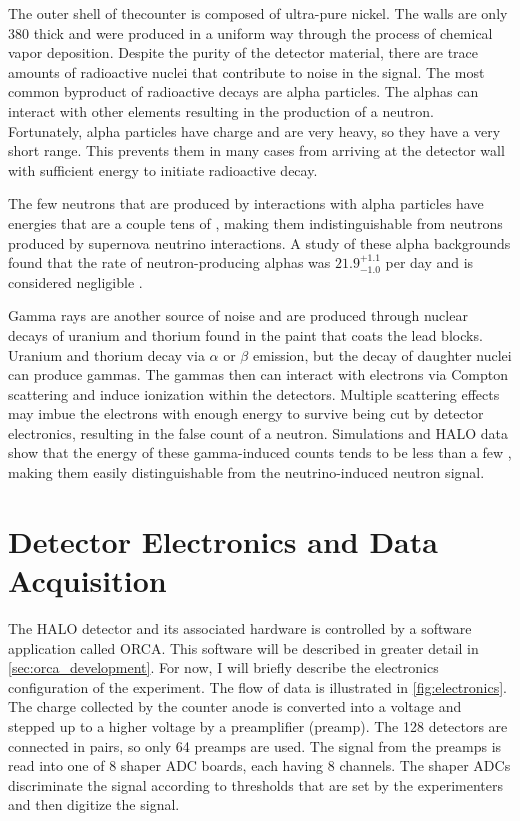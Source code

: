 		The outer shell of the\he counter is composed of ultra-pure nickel. The walls are only \SI{380}{\micron} thick and were produced in a uniform way through the process of chemical vapor deposition. Despite the purity of the detector material, there are trace amounts of radioactive nuclei that contribute to noise in the signal. The most common byproduct of radioactive decays are alpha particles. The alphas can interact with other elements resulting in the production of a neutron. Fortunately, alpha particles have charge and are very heavy, so they have a very short range. This prevents them in many cases from arriving at the detector wall with sufficient energy to initiate radioactive decay. 

		The few neutrons that are produced by interactions with alpha particles have energies that are a couple tens of \eMeV{}, making them indistinguishable from neutrons produced by supernova neutrino interactions. A study of these alpha backgrounds found that the rate of neutron-producing alphas was $21.9^{+1.1}_{-1.0}$ per day and is considered negligible \cite{Shantz2010}. 

		Gamma rays are another source of noise and are produced through nuclear decays of uranium and thorium found in the paint that coats the lead blocks. Uranium and thorium decay via $\alpha$ or $\beta$ emission, but the decay of daughter nuclei can produce gammas. The gammas then can interact with electrons via Compton scattering and induce ionization within the \he detectors. Multiple scattering effects may imbue the electrons with enough energy to survive being cut by detector electronics, resulting in the false count of a neutron. Simulations\cite{Shantz2010} and HALO data show that the energy of these gamma-induced counts tends to be less than a few \eMeV{}, making them easily distinguishable from the neutrino-induced neutron signal.


	\section{Detector Electronics and Data Acquisition}
	\label{sec:electronics}
	
		The HALO detector and its associated hardware is controlled by a software application called ORCA. This software will be described in greater detail in \SEC \ref{sec:orca_development}. For now, I will briefly describe the electronics configuration of the experiment. The flow of data is illustrated in \FIG \ref{fig:electronics}. The charge collected by the \he counter anode is converted into a voltage and stepped up to a higher voltage by a preamplifier (preamp). The 128 detectors are connected in pairs, so only 64 preamps are used. The signal from the preamps is read into one of 8 shaper ADC boards, each having 8 channels. The shaper ADCs discriminate the signal according to thresholds that are set by the experimenters and then digitize the signal.

